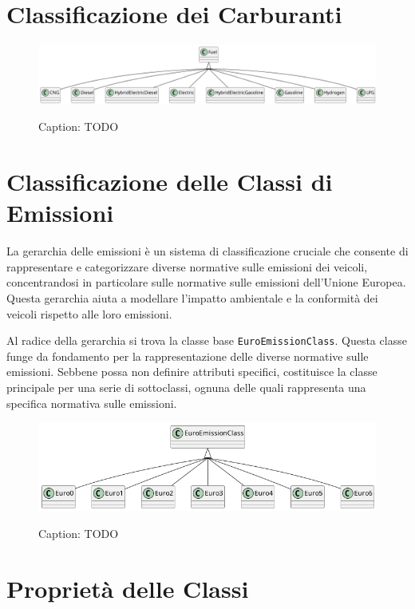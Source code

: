 \section{Classificazione dei Carburanti}

\begin{figure}[H]
    \caption{Caption: TODO}
    \includegraphics[width=\textwidth]{figures/carpedia-fuel.png}
    \label{fig:carpedia-fuel}
\end{figure}

\section{Classificazione delle Classi di Emissioni}

La gerarchia delle emissioni è un sistema di classificazione cruciale che  consente di rappresentare e categorizzare diverse normative sulle emissioni dei veicoli, concentrandosi in particolare sulle normative sulle emissioni dell'Unione Europea. Questa gerarchia aiuta a modellare l'impatto ambientale e la conformità dei veicoli rispetto alle loro emissioni.

Al radice della gerarchia si trova la classe base \texttt{EuroEmissionClass}. Questa classe funge da fondamento per la rappresentazione delle diverse normative sulle emissioni. Sebbene possa non definire attributi specifici, costituisce la classe principale per una serie di sottoclassi, ognuna delle quali rappresenta una specifica normativa sulle emissioni.

\begin{figure}[H]
    \caption{Caption: TODO}
    \includegraphics[width=\textwidth]{figures/carpedia-euro-emission.png}
    \label{fig:carpedia-euro-emission}
\end{figure}

\section{Proprietà delle Classi}

